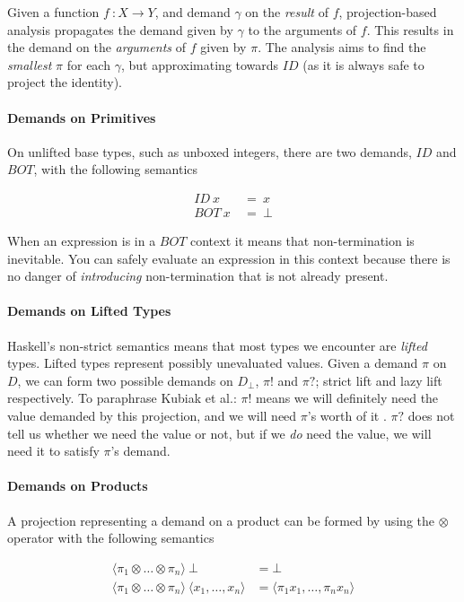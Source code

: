 \documentclass[preprint]{sigplanconf}
\begin{document}
Given a function $f \ : X \rightarrow Y$, and demand $\gamma$ on the
\emph{result} of $f$, projection-based analysis propagates the demand given by
$\gamma$ to the arguments of $f$. This results in the demand on the
\emph{arguments} of $f$ given by $\pi$.  The analysis aims to find the
\emph{smallest} $\pi$ for each $\gamma$, but approximating towards $ID$ (as
it is always safe to project the identity).

\paragraph{Demands on Primitives}
On unlifted base types, such as unboxed integers, there are two demands,
$ID$ and $BOT$, with the following semantics


\begin{align}
ID \ x \ &= \ x \\
BOT \ x \ &= \ \bot
\end{align}


When an expression is in a $BOT$ context it means that non-termination is
inevitable. You can safely evaluate an expression in this context because there
is no danger of \emph{introducing} non-termination that is not already present.

\paragraph{Demands on Lifted Types} Haskell's non-strict semantics means that
most types we encounter are \emph{lifted} types.  Lifted types represent
possibly unevaluated values. Given a demand $\pi$ on $D$, we can form two
possible demands on $D_{\bot}$, $\pi!$ and $\pi?$; strict lift and lazy lift
respectively. To paraphrase Kubiak et al.: $\pi!$ means we will definitely need
the value demanded by this projection, and we will need $\pi$'s worth of it
\citep{kubiak}. $\pi?$ does not tell us whether we need the value or not, but if
we \emph{do} need the value, we will need it to satisfy $\pi$'s demand.

\paragraph{Demands on Products} A projection representing a demand on a product
can be formed by using the $\otimes$ operator with the following semantics

\begin{align*}
\langle \pi_{1} \otimes \dots \otimes \pi_{n} \rangle \ \bot &= \bot \\
\langle \pi_{1} \otimes \dots \otimes \pi_{n} \rangle \ 
\langle x_{1}, \dots, x_{n} \rangle &= \langle \pi_{1} x_{1}, \dots, \pi_{n} x_{n} \rangle
\end{align*}
\end{document}
